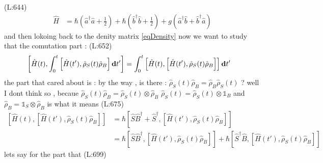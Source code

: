 (L:644)
\begin{equation}
\begin{split}
\hat{H }&=\hbar \left(\hat{a }^\dagger \hat{a }+\frac{1}{2}\right)+\hbar \left(\hat{b }^\dagger \hat{b }+\frac{1}{2}\right)+g \left(\hat{a }^\dagger \hat{b }+\hat{b }^\dagger \hat{a }\right)\end{split}
\end{equation}
 and then lokoing back to the denity matrix \eqref{eqDensity}
 now we want to study that the comutation part : 
(L:652)
\begin{equation}
\begin{split}
\left[\hat{H }(t ),\int _{0}^{t }\left[\hat{H }(t '),\hat{\rho }_{S }(t )\hat{\rho }_{B }\right]\bold{d}t '\right]&=\int _{0}^{t }\left[\hat{H }(t ),\left[\hat{H }(t '),\hat{\rho }_{S }(t )\hat{\rho }_{B }\right]\right]\bold{d}t '\end{split}
\end{equation}
 the part that cared about is :
 by the way , is there  :
 $ \hat{\rho }_{S }(t )\hat{\rho }_{B }=\hat{\rho }_{B }\hat{\rho }_{S }(t ) $ ? well I dont think so , becaue 
 $ \hat{\rho }_{S }(t )\hat{\rho }_{B }=\hat{\rho }_{S }(t )\otimes \hat{\rho }_{B } $  $ \hat{\rho }_{S }(t )=\hat{\rho }_{S }(t )\otimes \mathds{1}_{B } $  and 
 $ \hat{\rho }_{B }=\mathds{1}_{S }\otimes \hat{\rho }_{B } $  is what it means 
(L:675)
\begin{equation}
\begin{split}
\label{expandedHamComute}\left[\hat{H }(t ),\left[\hat{H }(t '),\hat{\rho }_{S }(t )\hat{\rho }_{B }\right]\right]&=\hbar \left[\hat{S }\hat{B }^\dagger +\hat{S }^\dagger ,\left[\hat{H }(t '),\hat{\rho }_{S }(t )\hat{\rho }_{B }\right]\right]\\
&=\hbar \left[\hat{S }\hat{B }^\dagger ,\left[\hat{H }(t '),\hat{\rho }_{S }(t )\hat{\rho }_{B }\right]\right]+\hbar \left[\hat{S }^\dagger \hat{B },\left[\hat{H }(t '),\hat{\rho }_{S }(t )\hat{\rho }_{B }\right]\right]\end{split}
\end{equation}
 lets say for the part that
(L:699)
